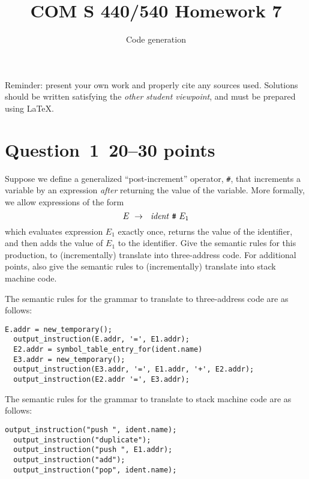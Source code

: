 \documentclass[10pt]{article}
\title{COM S 440/540 Homework 7}
\date{}
\author{Code generation}
\begin{document}
\maketitle

\noindent
Reminder: present your own work and properly cite any sources used.
Solutions should be written satisfying the \emph{other student viewpoint},
and must be prepared using \LaTeX.
\renewcommand{\thepage}{~}
\section*{Question~1~\hfill 20--30 points}

Suppose we define a generalized ``post-increment'' operator, \verb|#|,
that increments a variable by an expression \emph{after} returning
the value of the variable.
More formally, we allow expressions of the form
\[
  E ~\rightarrow~~\mathit{ident} ~ \verb|#| ~ E_1
\]
which evaluates expression $E_1$ exactly once,
returns the value of the identifier,
and then adds the value of $E_1$ to the identifier.
Give the semantic rules for this production,
to (incrementally) translate into three-address code.
For additional points, also give the semantic rules
to (incrementally) translate into stack machine code.

\begin{framed}
The semantic rules for the grammar to translate to three-address code are as follows:

\begin{lstlisting}[style=jvm]
  E.addr = new_temporary();
  output_instruction(E.addr, '=', E1.addr);
  E2.addr = symbol_table_entry_for(ident.name)
  E3.addr = new_temporary();
  output_instruction(E3.addr, '=', E1.addr, '+', E2.addr);
  output_instruction(E2.addr '=', E3.addr);
\end{lstlisting}

The semantic rules for the grammar to translate to stack machine code are as follows:

\begin{lstlisting}[style=jvm]
  output_instruction("push ", ident.name);
  output_instruction("duplicate");
  output_instruction("push ", E1.addr);
  output_instruction("add");
  output_instruction("pop", ident.name);
\end{lstlisting}

\end{framed}
\end{document}
